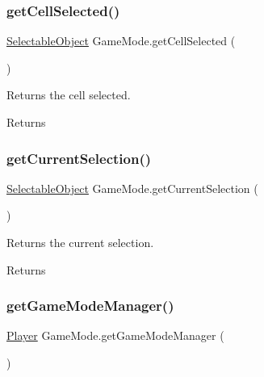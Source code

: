 \mbox{\label{class_game_mode_a4403dc7308e53384ec79bb67125f7324}} 
\subsubsection{\texorpdfstring{get\+Cell\+Selected()}{getCellSelected()}}
{\footnotesize\ttfamily \mbox{\hyperlink{class_selectable_object}{Selectable\+Object}} Game\+Mode.\+get\+Cell\+Selected (\begin{DoxyParamCaption}{ }\end{DoxyParamCaption})}



Returns the cell selected. 

\begin{DoxyReturn}{Returns}

\end{DoxyReturn}
\mbox{\label{class_game_mode_ab4b23a7abb615a7ae22212a140997f11}} 
\subsubsection{\texorpdfstring{get\+Current\+Selection()}{getCurrentSelection()}}
{\footnotesize\ttfamily \mbox{\hyperlink{class_selectable_object}{Selectable\+Object}} Game\+Mode.\+get\+Current\+Selection (\begin{DoxyParamCaption}{ }\end{DoxyParamCaption})}



Returns the current selection. 

\begin{DoxyReturn}{Returns}

\end{DoxyReturn}
\mbox{\label{class_game_mode_aa8a0deab7115a3c5fcf42503691a9a52}} 
\subsubsection{\texorpdfstring{get\+Game\+Mode\+Manager()}{getGameModeManager()}}
{\footnotesize\ttfamily \mbox{\hyperlink{class_player}{Player}} Game\+Mode.\+get\+Game\+Mode\+Manager (\begin{DoxyParamCaption}{ }\end{DoxyParamCaption})}



